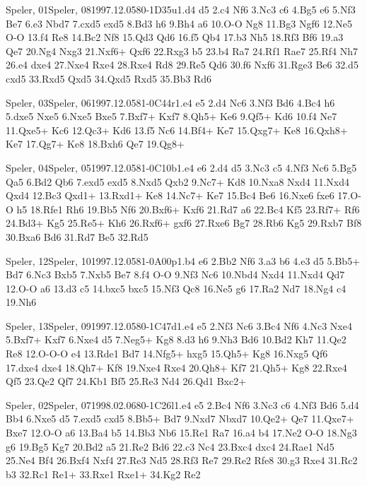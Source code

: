 \documentclass[twocolumn,a4paper,10pt]{report}
\begin{document}
\begin{chessgame}{Speler, 01}{Speler, 08}{1997.12.05}{8}{0-1}{D35u}{1.d4 d5 2.c4 Nf6 3.Nc3 c6 4.Bg5 e6 5.Nf3 Be7 6.e3 Nbd7 7.cxd5 exd5 8.Bd3 h6 9.Bh4 a6 10.O-O Ng8 11.Bg3 Ngf6 12.Ne5 O-O 13.f4 Re8 14.Bc2 Nf8 15.Qd3 Qd6 16.f5 Qb4 17.b3 Nh5 18.Rf3 Bf6 19.a3 Qe7 20.Ng4 Nxg3 21.Nxf6+ Qxf6 22.Rxg3 b5 23.b4 Ra7 24.Rf1 Rae7 25.Rf4 Nh7 26.e4 dxe4 27.Nxe4 Rxe4 28.Rxe4 Rd8 29.Re5 Qd6 30.f6 Nxf6 31.Rge3 Be6 32.d5 cxd5 33.Rxd5 Qxd5 34.Qxd5 Rxd5 35.Bb3 Rd6}\end{chessgame}
\begin{chessgame}{Speler, 03}{Speler, 06}{1997.12.05}{8}{1-0}{C44r}{1.e4 e5 2.d4 Nc6 3.Nf3 Bd6 4.Bc4 h6 5.dxe5 Nxe5 6.Nxe5 Bxe5 7.Bxf7+ Kxf7 8.Qh5+ Ke6 9.Qf5+ Kd6 10.f4 Ne7 11.Qxe5+ Kc6 12.Qc3+ Kd6 13.f5 Nc6 14.Bf4+ Ke7 15.Qxg7+ Ke8 16.Qxh8+ Ke7 17.Qg7+ Ke8 18.Bxh6 Qe7 19.Qg8+}\end{chessgame}
\begin{chessgame}{Speler, 04}{Speler, 05}{1997.12.05}{8}{1-0}{C10b}{1.e4 e6 2.d4 d5 3.Nc3 c5 4.Nf3 Nc6 5.Bg5 Qa5 6.Bd2 Qb6 7.exd5 exd5 8.Nxd5 Qxb2 9.Nc7+ Kd8 10.Nxa8 Nxd4 11.Nxd4 Qxd4 12.Bc3 Qxd1+ 13.Rxd1+ Ke8 14.Nc7+ Ke7 15.Bc4 Be6 16.Nxe6 fxe6 17.O-O h5 18.Rfe1 Rh6 19.Bb5 Nf6 20.Bxf6+ Kxf6 21.Rd7 a6 22.Bc4 Kf5 23.Rf7+ Rf6 24.Bd3+ Kg5 25.Re5+ Kh6 26.Rxf6+ gxf6 27.Rxe6 Bg7 28.Rb6 Kg5 29.Rxb7 Bf8 30.Bxa6 Bd6 31.Rd7 Be5 32.Rd5}\end{chessgame}
\begin{chessgame}{Speler, 12}{Speler, 10}{1997.12.05}{8}{1-0}{A00p}{1.b4 e6 2.Bb2 Nf6 3.a3 b6 4.e3 d5 5.Bb5+ Bd7 6.Nc3 Bxb5 7.Nxb5 Be7 8.f4 O-O 9.Nf3 Nc6 10.Nbd4 Nxd4 11.Nxd4 Qd7 12.O-O a6 13.d3 c5 14.bxc5 bxc5 15.Nf3 Qc8 16.Ne5 g6 17.Ra2 Nd7 18.Ng4 c4 19.Nh6\mate}\end{chessgame}
\begin{chessgame}{Speler, 13}{Speler, 09}{1997.12.05}{8}{0-1}{C47d}{1.e4 e5 2.Nf3 Nc6 3.Bc4 Nf6 4.Nc3 Nxe4 5.Bxf7+ Kxf7 6.Nxe4 d5 7.Neg5+ Kg8 8.d3 h6 9.Nh3 Bd6 10.Bd2 Kh7 11.Qe2 Re8 12.O-O-O e4 13.Rde1 Bd7 14.Nfg5+ hxg5 15.Qh5+ Kg8 16.Nxg5 Qf6 17.dxe4 dxe4 18.Qh7+ Kf8 19.Nxe4 Rxe4 20.Qh8+ Kf7 21.Qh5+ Kg8 22.Rxe4 Qf5 23.Qe2 Qf7 24.Kb1 Bf5 25.Re3 Nd4 26.Qd1 Bxc2+}\end{chessgame}
\begin{chessgame}{Speler, 02}{Speler, 07}{1998.02.06}{8}{0-1}{C26l}{1.e4 e5 2.Bc4 Nf6 3.Nc3 c6 4.Nf3 Bd6 5.d4 Bb4 6.Nxe5 d5 7.exd5 cxd5 8.Bb5+ Bd7 9.Nxd7 Nbxd7 10.Qe2+ Qe7 11.Qxe7+ Bxe7 12.O-O a6 13.Ba4 b5 14.Bb3 Nb6 15.Re1 Ra7 16.a4 b4 17.Ne2 O-O 18.Ng3 g6 19.Bg5 Kg7 20.Bd2 a5 21.Re2 Bd6 22.c3 Nc4 23.Bxc4 dxc4 24.Rae1 Nd5 25.Ne4 Bf4 26.Bxf4 Nxf4 27.Re3 Nd5 28.Rf3 Re7 29.Re2 Rfe8 30.g3 Rxe4 31.Rc2 b3 32.Rc1 Re1+ 33.Rxe1 Rxe1+ 34.Kg2 Re2}\end{chessgame}
\end{document}
